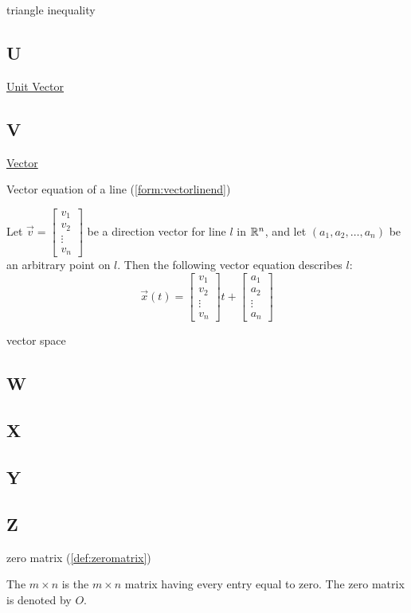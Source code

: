 \documentclass{ximera}
\begin{document}
triangle inequality

\subsection{U}
\href{https://ximera.osu.edu/oerlinalg/LinearAlgebra/VEC-0036/main}{Unit Vector}

\subsection{V}
\href{https://ximera.osu.edu/oerlinalg/LinearAlgebra/VEC-0010/main}{Vector}

Vector equation of a line (\ref{form:vectorlinend})
\begin{expandable}
    Let $\vec{v}=\begin{bmatrix}v_1\\v_2\\\vdots\\v_n\end{bmatrix}$ be a direction vector for line $l$ in $\mathbb{R}^n$, and let $(a_1, a_2,\ldots , a_n)$ be an arbitrary point on $l$.  Then the following vector equation describes $l$:
$$\vec{x}(t)=\begin{bmatrix}v_1\\v_2\\\vdots\\v_n\end{bmatrix}t+\begin{bmatrix}a_1\\a_2\\\vdots\\a_n\end{bmatrix}$$
\end{expandable}

vector space

\subsection{W}

\subsection{X}

\subsection{Y}

\subsection{Z}

zero matrix (\ref{def:zeromatrix})
\begin{expandable}
    The $m\times n$  is the $m\times n$ matrix
having every entry equal to zero. The zero matrix is
denoted by $O$.
\end{expandable}
\end{document}
